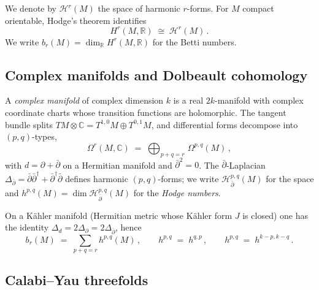 We denote by $\mathcal{H}^r(M)$ the space of harmonic $r$-forms. For
$M$ compact orientable, Hodge's theorem identifies
\begin{equation}\label{eq:hodge-iso}
    H^r(M,\mathbb{R}) \;\cong\; \mathcal{H}^r(M) \,.
\end{equation}
We write $b_r(M) = \dim_\mathbb{R} H^r(M,\mathbb{R})$ for the Betti
numbers.

\subsection{Complex manifolds and Dolbeault cohomology}

A \emph{complex manifold} of complex dimension $k$ is a real
$2k$-manifold with complex coordinate charts whose transition
functions are holomorphic. The tangent bundle splits
$TM\otimes\mathbb{C} = T^{1,0}M\oplus T^{0,1}M$, and differential forms
decompose into $(p,q)$-types,
\begin{equation}
    \Omega^r(M,\mathbb{C}) \;=\;
        \bigoplus_{p+q=r}\,\Omega^{p,q}(M) \,,
\end{equation}
with $d = \partial + \bar\partial$ on a Hermitian manifold and
$\bar\partial^2 = 0$. The $\bar\partial$-Laplacian
$\Delta_{\bar\partial} = \bar\partial\bar\partial^\dagger
+ \bar\partial^\dagger\bar\partial$ defines harmonic
$(p,q)$-forms; we write $\mathcal{H}^{p,q}_{\bar\partial}(M)$ for the
space and
$h^{p,q}(M) = \dim \mathcal{H}^{p,q}_{\bar\partial}(M)$
for the \emph{Hodge numbers}.

On a K\"ahler manifold (Hermitian metric whose K\"ahler form $J$ is
closed) one has the identity
$\Delta_d = 2\Delta_{\partial} = 2\Delta_{\bar\partial}$, hence
\begin{equation}\label{eq:betti-hodge}
    b_r(M) \;=\; \sum_{p+q=r} h^{p,q}(M) \,,
    \qquad h^{p,q} \;=\; h^{q,p} \,,
    \qquad h^{p,q} \;=\; h^{k-p,k-q} \,.
\end{equation}

\subsection{Calabi--Yau threefolds}

